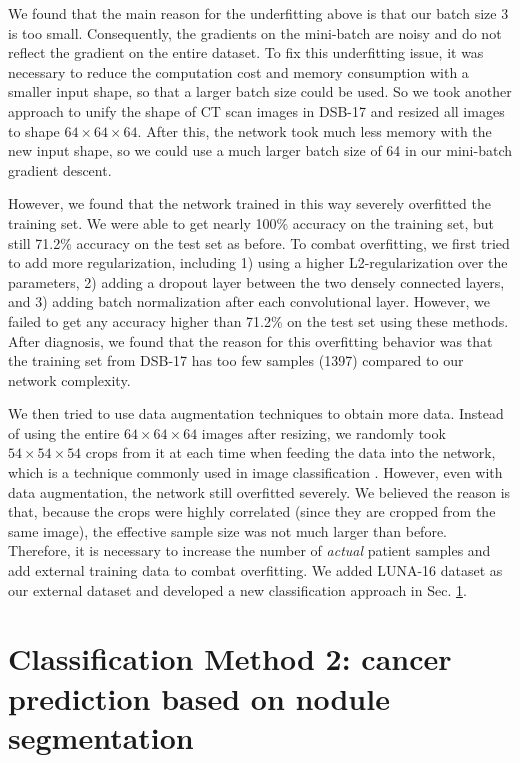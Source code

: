 \documentclass{article}
\begin{document}
We found that the main reason for the underfitting above is that our batch size 3 is too small. Consequently, the gradients on the mini-batch are noisy and do not reflect the gradient on the entire dataset. To fix this underfitting issue, it was necessary to reduce the computation cost and memory consumption with a smaller input shape, so that a larger batch size could be used. So we took another approach to unify the shape of CT scan images in DSB-17 and resized all images to shape $64\times 64 \times 64$. After this, the network took much less memory with the new input shape, so we could use a much larger batch size of 64 in our mini-batch gradient descent.

However, we found that the network trained in this way severely overfitted the training set. We were able to get nearly 100\% accuracy on the training set, but still 71.2\% accuracy on the test set as before. To combat overfitting, we first tried to add more  regularization, including 1) using a higher L2-regularization over the parameters, 2) adding a dropout layer \cite{krizhevsky2012imagenet} between the two densely connected layers, and 3) adding batch normalization \cite{ioffe2015batch} after each convolutional layer. However, we failed to get any accuracy higher than 71.2\% on the test set using these methods. After diagnosis, we found that the reason for this overfitting behavior was that the training set from DSB-17 has too few samples (1397) compared to our network complexity. 

We then tried to use data augmentation techniques to obtain more data. Instead of using the entire $64\times 64 \times 64$ images after resizing, we randomly took $54\times 54 \times 54$ crops from it at each time when feeding the data into the network, which is a technique commonly used in image classification \cite{krizhevsky2012imagenet}. However, even with data augmentation, the network still overfitted severely. We believed the reason is that, because the crops were highly correlated (since they are cropped from the same image), the effective sample size was not much larger than before. Therefore, it is necessary to increase the number of \textit{actual} patient samples and add external training data to combat overfitting. We added LUNA-16 dataset as our external dataset and developed a new classification approach in Sec. \ref{sec:method2}.

\section{Classification Method 2: cancer prediction based on nodule segmentation}
\label{sec:method2}
\end{document}
